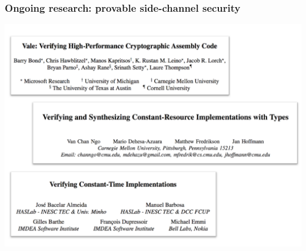 \documentclass[10pt]{beamer}
\begin{document}









\begin{frame}

\frametitle{Ongoing research: provable side-channel security}

\centering
\includegraphics[width=\textwidth]{sidechan-papers.pdf}

\end{frame}
\end{document}
